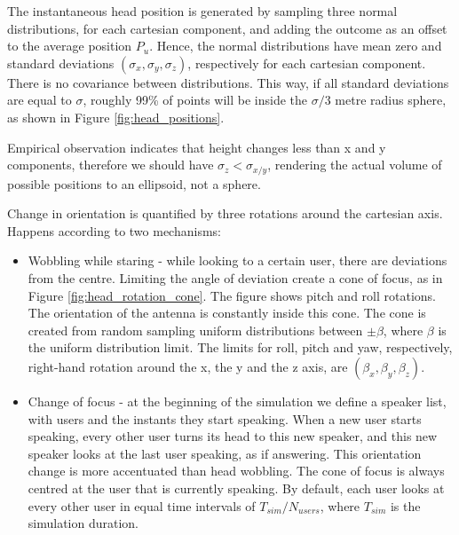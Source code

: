 The instantaneous head position is generated by sampling three normal distributions, for each cartesian component, and adding the outcome as an offset to the average position $P_u$. Hence, the normal distributions have mean zero and standard deviations $(\sigma_x, \sigma_y, \sigma_z)$, respectively for each cartesian component. There is no covariance between distributions. This way, if all standard deviations are equal to $\sigma$, roughly 99\% of points will be inside the $\sigma/3$ metre radius sphere, as shown in Figure \ref{fig:head_positions}.


Empirical observation indicates that height changes less than x and y components, therefore we should have $\sigma_z < \sigma_{x/y}$, rendering the actual volume of possible positions to an ellipsoid, not a sphere. 


Change in orientation is quantified by three rotations around the cartesian axis. Happens according to two mechanisms: 


\begin{itemize}
    \item Wobbling while staring - while looking to a certain user, there are deviations from the centre. Limiting the angle of deviation create a cone of focus, as in Figure \ref{fig:head_rotation_cone}. The figure shows pitch and roll rotations. The orientation of the antenna is constantly inside this cone. The cone is created from random sampling uniform distributions between $\pm \beta$, where $\beta$ is the uniform distribution limit. The limits for roll, pitch and yaw, respectively, right-hand rotation around the x, the y and the z axis, are $(\beta_x, \beta_y, \beta_z)$.
    \item Change of focus - at the beginning of the simulation we define a speaker list, with users and the instants they start speaking. When a new user starts speaking, every other user turns its head to this new speaker, and this new speaker looks at the last user speaking, as if answering. This orientation change is more accentuated than head wobbling. The cone of focus is always centred at the user that is currently speaking. By default, each user looks at every other user in equal time intervals of $T_{sim} / N_{users}$, where $T_{sim}$ is the simulation duration.
\end{itemize}


